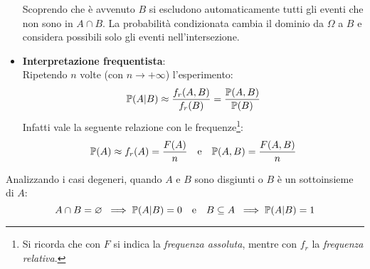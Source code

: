 \begin{itemize}
\begin{figure}[H]
  \end{figure}
  Scoprendo che è avvenuto $B$ si escludono automaticamente tutti gli eventi che non sono in $A \cap B$. La probabilità condizionata cambia il dominio da $\Omega$ a $B$ e considera possibili solo gli eventi nell'intersezione.

  \item \textbf{Interpretazione frequentista}:\\
  Ripetendo $n$ volte (con $n \to +\infty$) l'esperimento:
  $$\mathbb P(A|B) \approx \frac{f_r(A,B)}{f_r(B)} = \frac{\mathbb P(A,B)}{\mathbb P(B)}$$
  Infatti vale la seguente relazione con le frequenze\footnote{Si ricorda che con $F$ si indica la \emph{frequenza assoluta}, mentre con $f_r$ la \emph{frequenza relativa}.}:
  $$\mathbb P(A) \approx f_r(A) = \frac{F(A)}{n} \quad \text{e} \quad
  \mathbb P(A,B) = \frac{F(A,B)}n $$
\end{itemize}

Analizzando i casi degeneri, quando $A$ e $B$ sono disgiunti o $B$ è un sottoinsieme di $A$:\\[-8pt]
$$A \cap B = \varnothing \; \implies \mathbb P(A|B) = 0 \quad \text{e} \quad
B \subseteq A \; \implies \mathbb P(A|B) = 1$$


